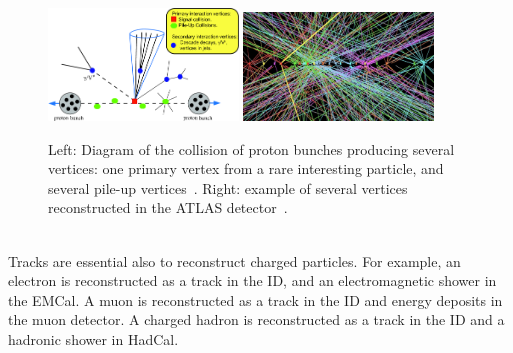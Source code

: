 \begin{figure}[!htb]
  \centering
  \includegraphics[width=0.45\textwidth]{plots/Vertices.png} 
  \includegraphics[width=0.45\textwidth]{plots/Vertices2.png} 
  \caption{Left: Diagram of the collision of proton bunches producing several vertices: one primary vertex from a rare interesting particle, and several pile-up vertices~\cite{ATLASVertices}. Right: example of several vertices reconstructed in the ATLAS detector~\cite{TrackMLPPTBefore}.}
  \label{fig:Vertices}
\end{figure}

\ \\Tracks are essential also to reconstruct charged particles. For example, an electron is reconstructed as a track in the ID, and an electromagnetic shower in the EMCal. A muon is reconstructed as a track in the ID and energy deposits in the muon detector. A charged hadron is reconstructed as a track in the ID and a hadronic shower in HadCal. 


